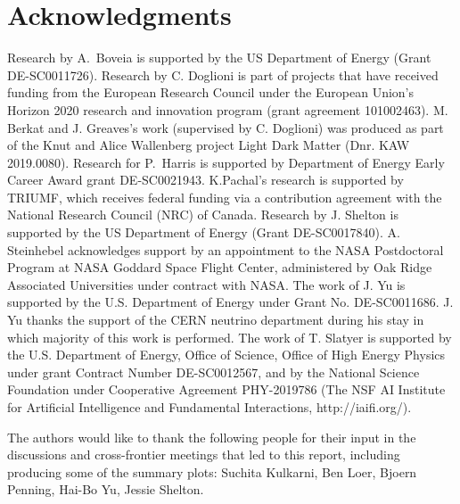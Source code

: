 \documentclass[nofootinbib]{article}
\begin{document}
\printbibliography
%
%

\section{Acknowledgments}

Research by A.~Boveia is supported by the US Department of Energy (Grant DE-SC0011726).
Research by C. Doglioni is part of projects that have received funding from the European Research Council under the European Union’s Horizon 2020 research and innovation program (grant agreement 101002463).
M. Berkat and J. Greaves's work (supervised by C. Doglioni) was produced as part of the Knut and Alice Wallenberg project Light Dark Matter (Dnr. KAW 2019.0080).
Research for P.~Harris is supported by Department of Energy Early Career Award grant DE-SC0021943.
K.Pachal's research is supported by TRIUMF, which receives federal funding via a contribution agreement with the National Research Council (NRC) of Canada.
Research by J. Shelton is supported by the US Department of Energy (Grant DE-SC0017840).
A. Steinhebel acknowledges support by an appointment to the NASA Postdoctoral Program at NASA Goddard Space Flight Center, administered by Oak Ridge Associated Universities under contract with NASA.
The work of J. Yu is supported by the U.S. Department of Energy under Grant No. DE-SC0011686.
J. Yu thanks the support of the CERN neutrino department during his stay in which majority of this work is performed.
The work of T. Slatyer is supported by the U.S. Department of Energy, Office of Science, Office of High Energy Physics under grant Contract Number DE-SC0012567, and by the National Science Foundation under Cooperative Agreement PHY-2019786 (The NSF AI Institute for Artificial Intelligence and Fundamental Interactions, http://iaifi.org/).


The authors would like to thank the following people for their input in the discussions and cross-frontier meetings that led to this report, including producing some of the summary plots: Suchita Kulkarni, Ben Loer, Bjoern Penning, Hai-Bo Yu, Jessie Shelton. 

\end{document}
